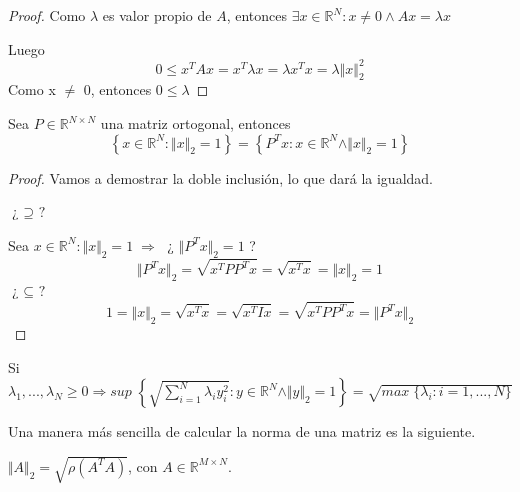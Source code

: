 \begin{proof}
Como $\lambda$ es valor propio de $A$, entonces $ \exists x \in \mathbb{R}^N : x \neq 0 \wedge Ax = \lambda x$

Luego
\[ 0 \leq x^TAx = x^T \lambda x = \lambda x^Tx = \lambda \Vert x \Vert _2^2 \]
Como x $\neq$ 0, entonces $ 0 \leq \lambda$
\end{proof}

\begin{nprop}
Sea $P \in \mathbb{R}^{N \times N}$ una matriz ortogonal, entonces
\[ \left\lbrace x \in \mathbb{R}^N : \Vert x \Vert _2 = 1 \right\rbrace = \left\lbrace P^Tx : x \in \mathbb{R}^N \wedge \Vert x \Vert _2 = 1 \right\rbrace \]
\end{nprop}

\begin{proof}
Vamos a demostrar la doble inclusión, lo que dará la igualdad.

$\textbf{¿ $\supseteq$ ?}$

Sea $x \in \mathbb{R}^N : \Vert x \Vert _2 = 1 \; \Rightarrow \;$ ¿ $\Vert P^Tx \Vert _2 = 1 $ ?
\[ \Vert P^Tx \Vert _2 = \sqrt{x^TPP^Tx} = \sqrt{x^Tx} = \Vert x \Vert _2 = 1 \]
$\textbf{¿ $\subseteq$ ?}$
\[ 1 = \Vert x \Vert _2 = \sqrt{x^Tx} = \sqrt{x^TIx} = \sqrt{x^TPP^Tx} = \Vert P^Tx \Vert _2 \]
\end{proof}

\begin{nprop}
Si $\lambda _1,..., \lambda _N \geq 0 \Rightarrow sup \; \left\lbrace \sqrt{\sum_{i=1}^N \lambda _iy_i^2} : y \in \mathbb{R}^N \wedge \Vert y \Vert _2 = 1 \right\rbrace = \sqrt{max \; \lbrace \lambda _i : i = 1,...,N \rbrace } $
\end{nprop}

Una manera más sencilla de calcular la norma de una matriz es la siguiente.

\begin{nprop}
$\Vert A \Vert _2 = \sqrt{\rho (A^TA)}$, con $A \in \mathbb{R}^{M \times N}$.
\end{nprop}

